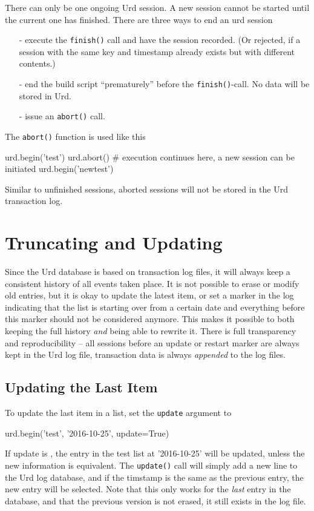There can only be one ongoing Urd session.  A new session cannot be
started until the current one has finished.  There are three ways to
end an urd session
\begin{itemize}
\item[-] execute the \texttt{finish()} call and have the session recorded.
(Or rejected, if a session with the same key and timestamp already
exists but with different contents.)
\item[-] end the build script ``prematurely'' before the
\texttt{finish()}-call.  No data will be stored in Urd.
\item[-] issue an \texttt{abort()} call.
\end{itemize}
The \texttt{abort()} function is used like this
\begin{python}
urd.begin('test')
urd.abort()
# execution continues here, a new session can be initiated
urd.begin('newtest')
\end{python}
Similar to unfinished sessions, aborted sessions will not be stored in
the Urd transaction log.





\section{Truncating and Updating}
\label{sec:trunc-update}
Since the Urd database is based on transaction log files, it will
always keep a consistent history of all events taken place.  It is not
possible to erase or modify old entries, but it is okay to update the
latest item, or set a marker in the log indicating that the list is
starting over from a certain date and everything before this marker
should not be considered anymore.  This makes it possible to both
keeping the full history \textsl{and} being able to rewrite it.  There
is full transparency and reproducibility -- all sessions before an
update or restart marker are always kept in the Urd log file,
transaction data is always \textsl{appended} to the log files.



\subsection{Updating the Last Item}
To update the last item in a list, set the \texttt{update} argument
to \pyTrue
\begin{python}
urd.begin('test', '2016-10-25', update=True)
\end{python}
If update is \pyTrue, the entry in the test list at '2016-10-25' will
be updated, unless the new information is equivalent.
The \texttt{update()} call will simply add a new line to the Urd log
database, and if the timstamp is the same as the previous entry, the
new entry will be selected.  Note that this only works for
the \textsl{last} entry in the database, and that the previous version
is not erased, it still exists in the log file.



